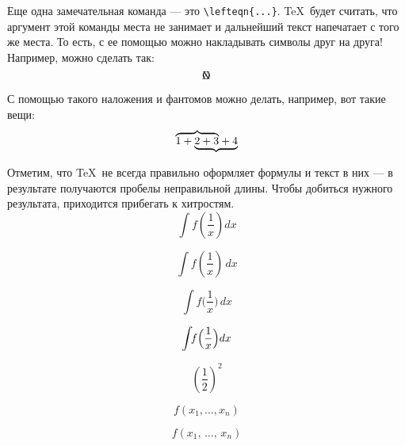 \documentclass{article}
\begin{document}
Еще одна замечательная команда --- это \verb|\lefteqn{...}|. \TeX\ будет считать, что аргумент этой команды места не занимает и дальнейший текст напечатает с того же места. То есть, с ее помощью можно накладывать символы друг на друга! Например, можно сделать так:
\[
\lefteqn{\mathrm{X}}\mathrm{O}
\]

С помощью такого наложения и фантомов можно делать, например, вот такие вещи:
\[
\lefteqn{\overbrace{\phantom{1+2+3}}} 1+ \underbrace{2+3+4}
\]

\newpage

Отметим, что \TeX\ не всегда правильно оформляет формулы и текст в них --- в результате получаются пробелы неправильной длины. Чтобы добиться нужного результата, приходится прибегать к хитростям. 
\[
\int f(\frac1x)dx
\]

\[
\int f(\frac1x)\,dx
\]

\[
\int f\bigl(\frac1x\bigr)\,dx
\]

\[
\int\!\! f\Bigl(\frac1x\Bigr)dx
\]

\[
\left( \frac12 \right)^{\!2}
\]

\[
f(x_1,\ldots,x_n)
\]

\[
f(x_1,\,\ldots,\,x_n)
\]
\end{document}
